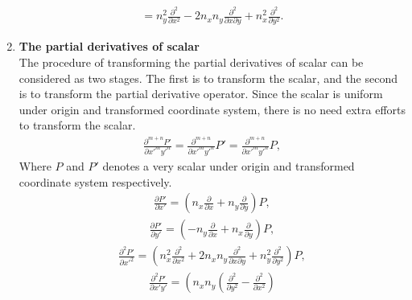 \documentclass[review]{elsarticle}
\begin{document}
\begin{enumerate}
\begin{equation}
\begin{gathered}
				=n_y^2\frac{\partial^2}{\partial x^2}-2n_xn_y\frac{\partial^2}{\partial x\partial y}+n_x^2\frac{\partial^2}{\partial y^2}.
	\end{gathered}
	\end{equation}
	\item \textbf{The partial derivatives of scalar}\\
	The procedure of transforming the partial derivatives of scalar can be considered as two stages. The first is to transform the scalar, and the second is to transform the partial derivative operator. Since the scalar is uniform under origin and transformed coordinate system, there is no need extra efforts to transform the scalar.
	\begin{equation}\label{TPScalarPxmyn}
	\begin{gathered}
		\frac{\partial^{m+n}P'}{\partial x'^my'^n} = \frac{\partial^{m+n}}{\partial x'^my'^n}P'
		=\frac{\partial^{m+n}}{\partial x'^my'^n}P,
	\end{gathered}
	\end{equation}
	Where $P$ and $P'$ denotes a very scalar under origin and transformed coordinate system respectively.  
	\begin{equation}\label{TPSPx}
	\begin{gathered}
		\frac{\partial{P'}}{\partial{x'}}
			=\left(n_x\frac{\partial}{\partial{x}} + n_y\frac{\partial}{\partial{y}}	\right)P,
	\end{gathered}
	\end{equation}
	\begin{equation}\label{TPSPy}
	\begin{gathered}
		\frac{\partial{P'}}{\partial{y'}} 
			= \left(-n_y\frac{\partial}{\partial{x}} + n_x\frac{\partial}{\partial{y}} \right)P,
	\end{gathered}
	\end{equation}
	\begin{equation}\label{TPSPx2}
	\begin{gathered}
		\frac{\partial^2{P'}}{\partial{x'^2}} 
			= \left(n_x^2\frac{\partial^2}{\partial x^2}+2n_xn_y\frac{\partial^2}{\partial x\partial y}
				+n_y^2\frac{\partial^2}{\partial y^2} \right)P,
	\end{gathered}
	\end{equation}
	\begin{equation}\label{TPSPxy}
	\begin{gathered}
		\frac{\partial^2{P'}}{\partial{x'y'}} 
			= \left(n_xn_y\left(\frac{\partial^2}{\partial y^2}-\frac{\partial^2}{\partial x^2}\right)

\end{gathered}
\end{equation}
\end{enumerate}
\end{document}
